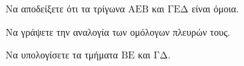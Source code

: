\begin{alist}
    \item Να αποδείξετε ότι τα τρίγωνα $\mathrm{AEB}$ και $\mathrm{\Gamma E \Delta}$ είναι όμοια. 
    \item Να γράψετε την αναλογία των ομόλογων πλευρών τους. 
    \item Να υπολογίσετε τα τμήματα $\mathrm{BE}$ και $\mathrm{\Gamma \Delta}$. 
\end{alist}